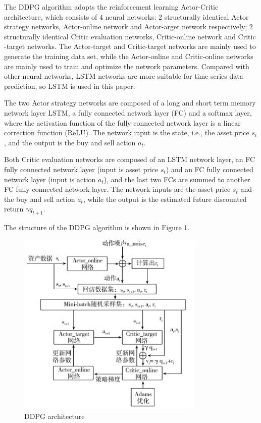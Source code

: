 \documentclass[13pt]{ctexart}
\begin{document}
The DDPG algorithm\cite{2017A} adopts the reinforcement learning Actor-Critic architecture, which consists of 4 neural networks: 2 structurally identical Actor strategy networks, Actor-online network and Actor-arget network respectively; 2 structurally identical Critic evaluation networks, Critic-online network and Critic -target networks. The Actor-target and Critic-target networks are mainly used to generate the training data set, while the Actor-online and Critic-online networks are mainly used to train and optimize the network parameters. Compared with other neural networks, LSTM networks are more suitable for time series data prediction, so LSTM is used in this paper.

The two Actor strategy networks are composed of a long and short term memory network layer LSTM, a fully connected network layer (FC) and a softmax layer, where the activation function of the fully connected network layer is a linear correction function (ReLU). The network input is the state, i.e., the asset price $ s_t $, and the output is the buy and sell action $ a_t $.

Both Critic evaluation networks are composed of an LSTM network layer, an FC fully connected network layer (input is asset price $ s_t $) and an FC fully connected network layer (input is action $ a_t $), and the last two FCs are summed to another FC fully connected network layer. The network inputs are the asset price $ s_t $ and the buy and sell action $ a_t $, while the output is the estimated future discounted return $ γq_{t + 1} $.

The structure of the DDPG algorithm is shown in Figure 1.
\begin{figure}[h]
	\centering
	\includegraphics[width=0.8\textwidth]{img/img1.png}
	\caption{DDPG architecture}
	\label{fig:DDPG_architecture}
\end{figure}
\end{document}
